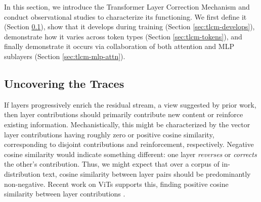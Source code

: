 \label{big_sec:tlcm}






In this section, we introduce the Transformer Layer Correction Mechanism and conduct observational studies to characterize its functioning. We first define it (Section \ref{sec:tlcm-exists}), show that it develops during training (Section \ref{sec:tlcm-develops}), demonstrate how it varies across token types (Section \ref{sec:tlcm-tokens}), and finally demonstrate it occurs via collaboration of both attention and MLP sublayers (Section \ref{sec:tlcm-mlp-attn}).

\subsection{Uncovering the Traces}
\label{sec:tlcm-exists}

If layers progressively enrich the residual stream, a view suggested by prior work, then layer contributions should primarily contribute new content or reinforce existing information. Mechanistically, this might be characterized by the vector layer contributions having roughly zero or positive cosine similarity, corresponding to disjoint contributions and reinforcement, respectively. Negative cosine similarity would indicate something different: one layer \textit{reverses} or \textit{corrects} the other's contribution. Thus, we might expect that over a corpus of in-distribution text, cosine similarity between layer pairs should be predominantly non-negative. Recent work on ViTs supports this, finding positive cosine similarity between layer contributions \cite{jiang2025tracingrepresentationprogressionanalyzing}.


